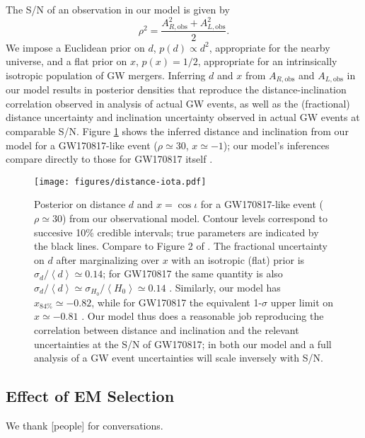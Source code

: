 \documentclass[modern]{aastex631}
\newcommand{\obs}{\mathrm{obs}}
\begin{document}
The S/N of an observation in our model is given by 
\begin{equation}
    \rho^2 = \frac{A_{R,\obs}^2 + A_{L,\obs}^2}{2}.
\end{equation}
We impose a Euclidean prior on $d$, $p(d) \propto d^2$, appropriate for the
nearby universe, and a flat prior on $x$, $p(x) = 1/2$, appropriate for an
intrinsically isotropic population of GW mergers.  Inferring $d$ and $x$ from
$A_{R,\obs}$ and $A_{L,\obs}$ in our model results in posterior densities that
reproduce the distance-inclination correlation observed in analysis of actual GW
events, as well as the (fractional) distance uncertainty and inclination
uncertainty observed in actual GW events at comparable S/N.  Figure
\ref{fig:distance-iota} shows the inferred distance and inclination from our
model for a GW170817-like event ($\rho \simeq 30$, $x \simeq -1$); our model's
inferences compare directly to those for GW170817 itself \citep{Abbott2017}.

\begin{figure}
    \texttt{[image: figures/distance-iota.pdf]}
    \caption{\label{fig:distance-iota} Posterior on distance $d$ and $x = \cos
    \iota$ for a GW170817-like event ($\rho \simeq 30$) from our observational
    model.  Contour levels correspond to succesive 10\% credible intervals; true
    parameters are indicated by the black lines.  Compare to Figure 2 of
    \citet{Abbott2017}.  The fractional uncertainty on $d$ after marginalizing
    over $x$ with an isotropic (flat) prior is $\sigma_d / \left\langle d
    \right\rangle \simeq 0.14$; for GW170817 the same quantity is also $\sigma_d
    / \left\langle d \right\rangle \simeq \sigma_{H_0} / \left\langle H_0
    \right\rangle \simeq 0.14$ \citep{Abbott2017}.  Similarly, our model has
    $x_{84\%} \simeq -0.82$, while for GW170817 the equivalent 1-$\sigma$ upper
    limit on $x \simeq -0.81$ \citep{Abbott2017}.  Our model thus does a
    reasonable job reproducing the correlation between distance and inclination
    and the relevant uncertainties at the S/N of GW170817; in both our model and
    a full analysis of a GW event uncertainties will scale inversely with S/N.}
\end{figure}

\subsection{Effect of EM Selection}

\begin{acknowledgments}
    We thank [people] for conversations.
\end{acknowledgments}



\end{document}
